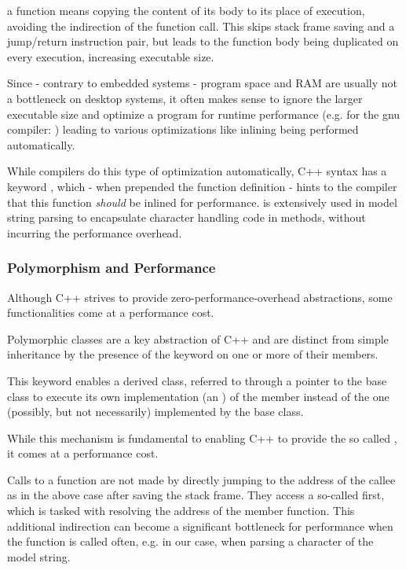  a function means copying the content of its body to its place of execution, avoiding the indirection of the function call. This skips stack frame saving and a jump/return instruction pair, but leads to the function body being duplicated on every execution, increasing executable size.

Since - contrary to embedded systems - program space and RAM are usually not a bottleneck on desktop systems, it often makes sense to ignore the larger executable size and optimize a program for runtime performance (e.g. for the \gls{gnu} compiler:  ) leading to various optimizations like inlining being performed automatically.

While compilers do this type of optimization automatically, C++ syntax has a keyword , which - when prepended the function definition - hints to the compiler that this function \emph{should} be inlined for performance.
 is extensively used in model string parsing to encapsulate character handling code in methods, without incurring the performance overhead.

\subsubsection{Polymorphism and Performance}
Although C++ strives to provide zero-performance-overhead abstractions, some functionalities come at a performance cost.

Polymorphic classes are a key abstraction of C++ and are distinct from simple inheritance by the presence of the  keyword on one or more of their members.

This keyword enables a derived class, referred to through a pointer to the base class to execute its own implementation (an ) of the  member instead of the one (possibly, but not necessarily) implemented by the base class.

While this mechanism is fundamental to enabling C++ to provide the so called , it comes at a performance cost.

Calls to a  function are not made by directly jumping to the address of the callee as in the above case after saving the stack frame. They access a so-called  first, which is tasked with resolving the address of the member function. This additional indirection can become a significant bottleneck for performance when the  function is called often, e.g. in our case, when parsing a character of the model string.


